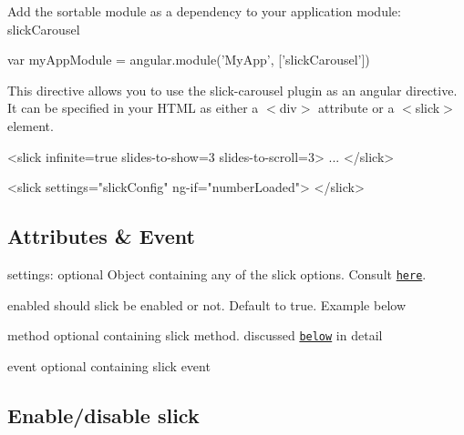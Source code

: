 \begin{DoxyItemize}
\item Add the sortable module as a dependency to your application module\+: {\ttfamily slick\+Carousel}
\end{DoxyItemize}


\begin{DoxyCode}
var myAppModule = angular.module('MyApp', ['slickCarousel'])
\end{DoxyCode}


This directive allows you to use the slick-\/carousel plugin as an angular directive. It can be specified in your H\+T\+ML as either a {\ttfamily $<$div$>$} attribute or a {\ttfamily $<$slick$>$} element.


\begin{DoxyCode}
<slick infinite=true slides-to-show=3 slides-to-scroll=3>
...
</slick>

<slick 
    settings="slickConfig" ng-if="numberLoaded">
</slick>
\end{DoxyCode}


\subsection*{Attributes \& Event}

{\ttfamily settings}\+: optional {\ttfamily Object} containing any of the slick options. Consult \href{http://kenwheeler.github.io/slick/#settings}{\tt here}.
\begin{DoxyItemize}
\item {\ttfamily enabled} should slick be enabled or not. Default to true. Example below
\item {\ttfamily method} optional containing slick method. discussed \href{#method}{\tt below} in detail
\item {\ttfamily event} optional containing slick event
\end{DoxyItemize}


 \subsection*{Enable/disable slick}

